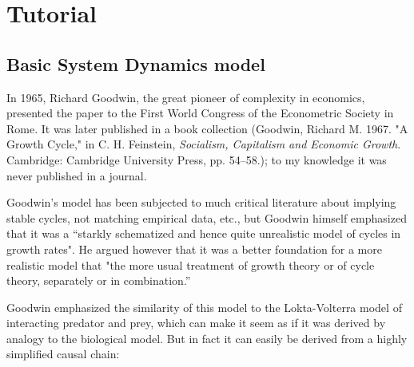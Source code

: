 \chapter{Tutorial}\label{tutorial}

\section{Basic System Dynamics model}

In 1965, Richard Goodwin, the great pioneer of complexity in
economics, presented the paper  to
the First World Congress of the Econometric Society in Rome. It was
later published in a book collection (Goodwin, Richard M. 1967. "A
Growth Cycle," in C. H. Feinstein, {\em Socialism, Capitalism and Economic
Growth}. Cambridge: Cambridge University Press, pp. 54--58.); to my
knowledge it was never published in a journal. 

Goodwin's model has been subjected to much critical literature about
implying stable cycles, not matching empirical data, etc., but Goodwin
himself emphasized that it was a ``starkly schematized and hence quite
unrealistic model of cycles in growth rates". He argued however that
it was a better foundation for a more realistic model that "the more
usual treatment of growth theory or of cycle theory, separately or in
combination.'' 

Goodwin emphasized the similarity of this model to the Lokta-Volterra
model of interacting predator and prey, which can make it seem as if
it was derived by analogy to the biological model. But in fact it can
easily be derived from a highly simplified causal chain:

